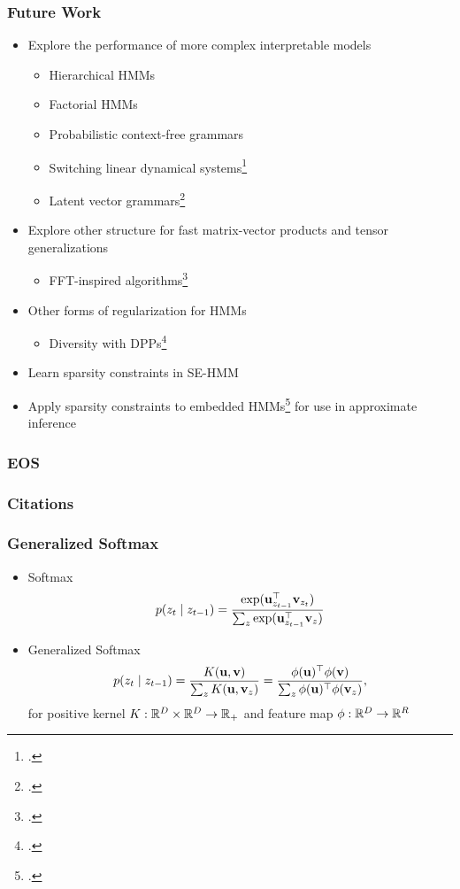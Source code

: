 \documentclass{beamer}
\begin{document}
\begin{frame}
\frametitle{Future Work}
\begin{itemize}
\item Explore the performance of more complex interpretable models
    \begin{itemize}
    \item Hierarchical HMMs
    \item Factorial HMMs
    \item Probabilistic context-free grammars
    \item Switching linear dynamical systems\footcite{switch}
    \item Latent vector grammars\footcite{lveg}
    \end{itemize}
\item Explore other structure for fast matrix-vector products and tensor generalizations
    \begin{itemize}
    \item FFT-inspired algorithms\footcite{kal}
    \end{itemize}
\item Other forms of regularization for HMMs
    \begin{itemize}
    \item Diversity with DPPs\footcite{dhmm}
    \end{itemize}
\item Learn sparsity constraints in SE-HMM
\item Apply sparsity constraints to embedded HMMs\footcite{embhmm} for use in approximate inference
\end{itemize}
\end{frame}


\begin{frame}
\frametitle{EOS}
\end{frame}


\begin{frame}
\frametitle{Citations}
\printbibliography
%
%
\end{frame}

\begin{frame}
\frametitle{Generalized Softmax}
\begin{itemize}
\item Softmax
$$p(z_t \mid z_{t-1}) = \frac{\exp(\mathbf{u}_{z_{t-1}}^\top \mathbf{v}_{z_{t}})}
{\sum_z \exp(\mathbf{u}_{z_{t-1}}^\top \mathbf{v}_z)}$$
\vspace{1em}
\item Generalized Softmax
$$p(z_t \mid z_{t-1})
= \frac{K(\mathbf{u}, \mathbf{v})}{\sum_z K(\mathbf{u},\mathbf{v}_z)}
= \frac{\phi(\mathbf{u})^\top\phi(\mathbf{v})}
    {\sum_z \phi(\mathbf{u})^\top\phi(\mathbf{v}_z)},$$
for positive kernel $K:\mathbb{R}^D\times\mathbb{R}^D\to\mathbb{R}_+$
and feature map $\phi:\mathbb{R}^D\to\mathbb{R}^R$
\end{itemize}
\end{frame}
\end{document}
